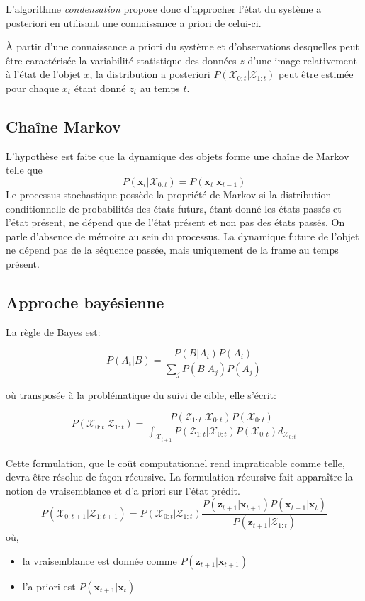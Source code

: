 \documentclass[a4paper,12pt]{report}
\begin{document}
L'algorithme \textit{condensation} propose donc d'approcher l'état du système a posteriori en utilisant une connaissance a priori de celui-ci.
 
À partir d'une connaissance a priori du système et d'observations desquelles peut être caractérisée la variabilité statistique des données $z$ d'une image relativement à l'état de l'objet $x$, la distribution a posteriori $P(\mathcal{X}_{0:t}|\mathcal{Z}_{1:t})$ peut être estimée pour chaque $x_t$ étant donné $z_t$ au temps $t$.\\

\subsection{Chaîne Markov}
L'hypothèse est faite que la dynamique des objets forme une chaîne de Markov telle que $$P(\mathbf{x}_{t}|\mathcal{X}_{0:t})=P(\mathbf{x}_t|\mathbf{x}_{t-1})$$
Le processus stochastique possède la propriété de Markov si la distribution conditionnelle de probabilités des états futurs, étant donné les états passés et l'état présent, ne dépend que de l'état présent et non pas des états passés. 
On parle d'absence de mémoire au sein du processus.
La dynamique future de l'objet ne dépend pas de la séquence passée, mais uniquement de la frame  au temps présent.


\subsection{Approche bayésienne}
La règle de Bayes est:

$$P(A_i|B) = \frac{P(B | A_i) P(A_i)}{\sum_j P(B|A_j)P(A_j)}$$

où transposée à la problématique du suivi de cible, elle s'écrit:

$$P(\mathcal{X}_{0:t}|\mathcal{Z}_{1:t}) =  \frac{P(\mathcal{Z}_{1:t}|\mathcal{X}_{0:t})P(\mathcal{X}_{0:t})}{\int_{\mathcal{X}_{t+1}}P(\mathcal{Z}_{1:t}|\mathcal{X}_{0:t})P(\mathcal{X}_{0:t})d_{\mathcal{X}_{0:t}}}$$\\

Cette formulation, que le coût computationnel rend impraticable comme telle, devra être résolue de façon récursive. 
La formulation récursive fait apparaître la notion de vraisemblance et d'a priori sur l'état prédit.
$$P(\mathcal{X}_{0:t+1}|\mathcal{Z}_{1:t+1}) = P(\mathcal{X}_{0:t}|\mathcal{Z}_{1:t})\frac{P(\mathbf{z}_{t+1}|\mathbf{x}_{t+1})P(\mathbf{x}_{t+1}|\mathbf{x}_{t})}{P(\mathbf{z}_{t+1}|\mathcal{Z}_{1:t})}$$
où,
\begin{itemize}
\item[] la vraisemblance est donnée comme $P(\mathbf{z}_{t+1}|\mathbf{x}_{t+1})$
\item[] l'a priori est $P(\mathbf{x}_{t+1}|\mathbf{x}_{t})$\\
\end{itemize}
\end{document}
